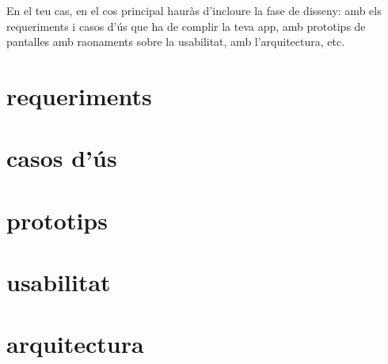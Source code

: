 En el teu cas, en el cos principal hauràs d'incloure la fase de disseny:
 amb els requeriments i casos d'ús que ha de complir la teva app,
amb prototips de pantalles amb raonaments sobre la usabilitat, amb l'arquitectura, etc.


\section{requeriments}
\section{casos d'ús}
\section{prototips}
\section{usabilitat}
\section{arquitectura}